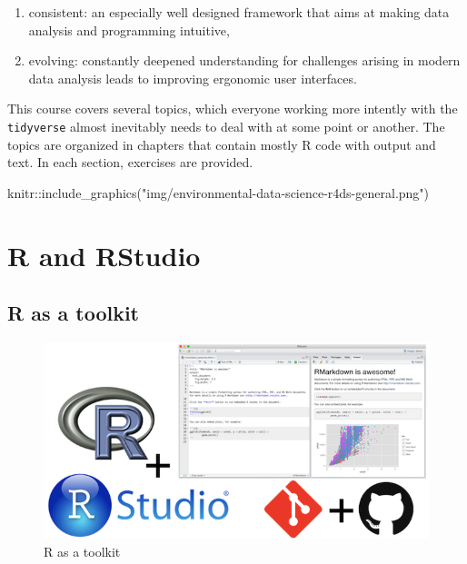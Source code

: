\documentclass[]{book}
\newenvironment{Shaded}{}{}
\newcommand{\KeywordTok}[1]{\textcolor[rgb]{0.00,0.00,1.00}{#1}}
\newcommand{\NormalTok}[1]{#1}
\newcommand{\OperatorTok}[1]{#1}
\newcommand{\StringTok}[1]{\textcolor[rgb]{0.00,0.50,0.50}{#1}}
\providecommand{\tightlist}{%
  \setlength{\itemsep}{0pt}\setlength{\parskip}{0pt}}
\begin{document}
\begin{enumerate}
\def\labelenumi{\arabic{enumi}.}
\tightlist
\item
  consistent: an especially well designed framework that aims at making data analysis and programming intuitive,
\item
  evolving: constantly deepened understanding for challenges arising in modern data analysis leads to improving ergonomic user interfaces.
\end{enumerate}

This course covers several topics, which everyone working more intently with the \texttt{tidyverse} almost inevitably needs to deal with at some point or another.
The topics are organized in chapters that contain mostly R code with output and text.
In each section, exercises are provided.

\begin{Shaded}
\begin{Highlighting}[]
\NormalTok{knitr}\OperatorTok{::}\KeywordTok{include_graphics}\NormalTok{(}\StringTok{"img/environmental-data-science-r4ds-general.png"}\NormalTok{)}
\end{Highlighting}
\end{Shaded}

\hypertarget{r-and-rstudio}{%
\chapter{R and RStudio}\label{r-and-rstudio}}

\hypertarget{r-as-a-toolkit}{%
\section{R as a toolkit}\label{r-as-a-toolkit}}

\begin{figure}
\centering
\includegraphics{img/toolkit.png}
\caption{R as a toolkit}
\end{figure}
\end{document}
